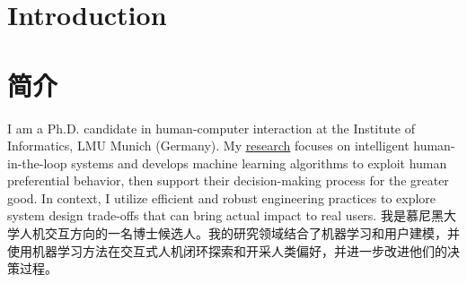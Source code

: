  {
\section{\textbf{Introduction}}
}{
\section{\textbf{简介}}
}
 {
\small
I am a Ph.D. candidate in human-computer interaction at the Institute of Informatics, LMU Munich (Germany). My \href{https://changkun.de/research}{\underline{research}} focuses on intelligent human-in-the-loop systems and develops machine learning algorithms to exploit human preferential behavior, then support their decision-making process for the greater good. In context, I utilize efficient and robust engineering practices to explore system design trade-offs that can bring actual impact to real users.
}{
\small
我是慕尼黑大学人机交互方向的一名博士候选人。我的研究领域结合了机器学习和用户建模，并使用机器学习方法在交互式人机闭环探索和开采人类偏好，并进一步改进他们的决策过程。
}
